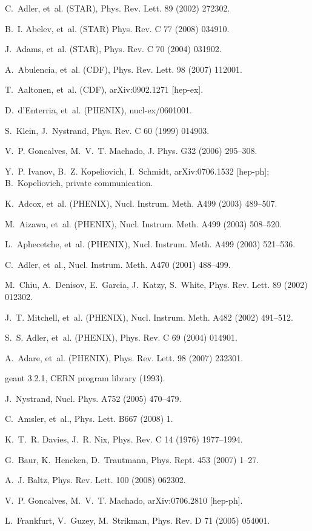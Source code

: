 \documentclass[dvipdfm]{elsart}
\begin{document}
\begin{thebibliography}{10}
C.~Adler, et~al. (STAR), Phys. Rev. Lett. 89 (2002) 272302.

B.~I. Abelev, et~al. (STAR) Phys. Rev. C 77 (2008) 034910.

J.~Adams, et~al. (STAR), Phys. Rev. C 70 (2004) 031902.

A.~Abulencia, et~al. (CDF), Phys. Rev. Lett. 98 (2007) 112001.

T.~Aaltonen, et~al. (CDF), arXiv:0902.1271 [hep-ex].

D.~d'Enterria, et~al. (PHENIX), nucl-ex/0601001.

S.~Klein, J.~Nystrand, Phys. Rev. C 60 (1999) 014903.

V.~P. Goncalves, M.~V.~T. Machado, J. Phys. G32 (2006) 295--308.

Y.~P. Ivanov, B.~Z. Kopeliovich, I.~Schmidt, arXiv:0706.1532 [hep-ph];
  B.~Kopeliovich, private communication.

K.~Adcox, et~al. (PHENIX), Nucl. Instrum. Meth. A499 (2003) 489--507.

M.~Aizawa, et~al. (PHENIX), Nucl. Instrum. Meth. A499 (2003) 508--520.

L.~Aphecetche, et~al. (PHENIX), Nucl. Instrum. Meth. A499 (2003) 521--536.

C.~Adler, et~al., Nucl. Instrum. Meth. A470 (2001) 488--499.

M.~Chiu, A.~Denisov, E.~Garcia, J.~Katzy, S.~White, Phys. Rev. Lett. 89 (2002)
  012302.

J.~T. Mitchell, et~al. (PHENIX), Nucl. Instrum. Meth. A482 (2002) 491--512.

S.~S. Adler, et~al. (PHENIX), Phys. Rev. C 69 (2004) 014901.

A.~Adare, et~al. (PHENIX), Phys. Rev. Lett. 98 (2007) 232301.

{\sc geant} 3.2.1, CERN program library (1993).

J.~Nystrand, Nucl. Phys. A752 (2005) 470--479.

C.~Amsler, et~al., Phys. Lett. B667 (2008) 1.

K.~T.~R. Davies, J.~R. Nix, Phys. Rev. C 14 (1976) 1977--1994.

G.~Baur, K.~Hencken, D.~Trautmann, Phys. Rept. 453 (2007) 1--27.

A.~J. Baltz, Phys. Rev. Lett. 100 (2008) 062302.

V.~P. Goncalves, M.~V.~T. Machado, arXiv:0706.2810 [hep-ph].

L.~Frankfurt, V.~Guzey, M.~Strikman, Phys. Rev. D 71 (2005) 054001.

\end{thebibliography}
\end{document}
